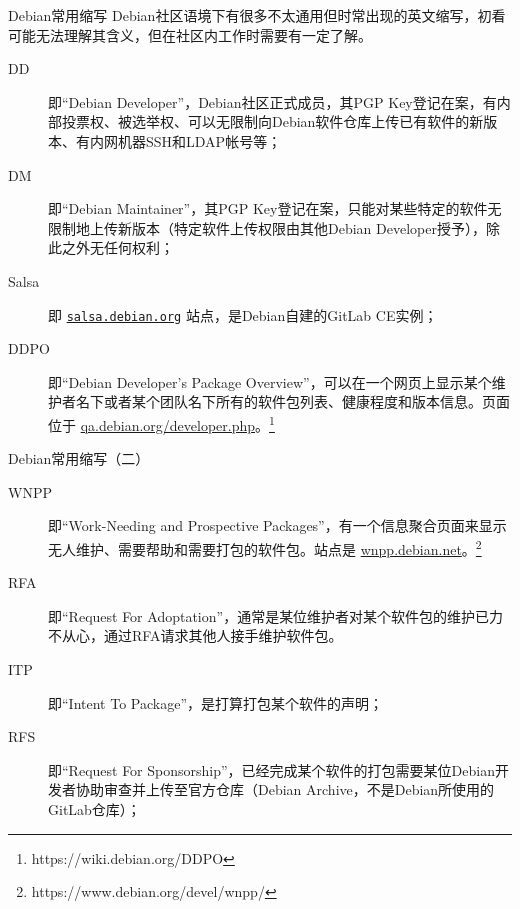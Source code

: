 \begin{frame}{Debian常用缩写}
	Debian社区语境下有很多不太通用但时常出现的英文缩写，初看可能无法理解其含义，但在社区内工作时需要有一定了解。
	\begin{description}
		\item[DD] 即“Debian Developer”，Debian社区正式成员，其PGP Key登记在案，有内部投票权、被选举权、可以无限制向Debian软件仓库上传已有软件的新版本、有内网机器SSH和LDAP帐号等；
		\item[DM] 即“Debian Maintainer”，其PGP Key登记在案，只能对某些特定的软件无限制地上传新版本（特定软件上传权限由其他Debian Developer授予），除此之外无任何权利；
		\item[Salsa] 即 \texttt{\href{https://salsa.debian.org/}{salsa.debian.org}} 站点，是Debian自建的GitLab CE实例；
		\item[DDPO] 即“Debian Developer's Package Overview”，可以在一个网页上显示某个维护者名下或者某个团队名下所有的软件包列表、健康程度和版本信息。页面位于 \href{https://qa.debian.org/developer.php}{qa.debian.org/developer.php}。\footnote{https://wiki.debian.org/DDPO}

		
	\end{description}
\end{frame}

\begin{frame}{Debian常用缩写（二）}
	\begin{description}
		\item[WNPP] 即“Work-Needing and Prospective Packages”，有一个信息聚合页面来显示无人维护、需要帮助和需要打包的软件包。站点是 \href{https://wnpp.debian.net}{wnpp.debian.net}。\footnote{https://www.debian.org/devel/wnpp/}
		\item[RFA] 即“Request For Adoptation”，通常是某位维护者对某个软件包的维护已力不从心，通过RFA请求其他人接手维护软件包。
		\item[ITP] 即“Intent To Package”，是打算打包某个软件的声明；
		\item[RFS] 即“Request For Sponsorship”，已经完成某个软件的打包需要某位Debian开发者协助审查并上传至官方仓库（Debian Archive，不是Debian所使用的GitLab仓库）；
		
	\end{description}
\end{frame}